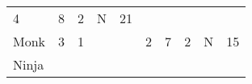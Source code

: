 \documentclass[12pt]{article}
\newcommand{\indexClass}[1]{\index{#1}}
\newcommand{\class}[1]{#1\indexClass{#1}}
\begin{document}
\begin{longtable}[]{@{}llllllllll@{}}
\begin{minipage}[t]{0.06\columnwidth}\raggedright\strut
4
\strut\end{minipage} &
\begin{minipage}[t]{0.06\columnwidth}\raggedright\strut
8
\strut\end{minipage} &
\begin{minipage}[t]{0.06\columnwidth}\raggedright\strut
2
\strut\end{minipage} &
\begin{minipage}[t]{0.07\columnwidth}\raggedright\strut
N
\strut\end{minipage} &
\begin{minipage}[t]{0.08\columnwidth}\raggedright\strut
21
\strut\end{minipage}\tabularnewline
\begin{minipage}[t]{0.13\columnwidth}\raggedright\strut
\class{Monk}
\strut\end{minipage} &
\begin{minipage}[t]{0.06\columnwidth}\raggedright\strut
3
\strut\end{minipage} &
\begin{minipage}[t]{0.06\columnwidth}\raggedright\strut
1
\strut\end{minipage} &
\begin{minipage}[t]{0.06\columnwidth}\raggedright\strut
\strut\end{minipage} &
\begin{minipage}[t]{0.06\columnwidth}\raggedright\strut
\strut\end{minipage} &
\begin{minipage}[t]{0.06\columnwidth}\raggedright\strut
2
\strut\end{minipage} &
\begin{minipage}[t]{0.06\columnwidth}\raggedright\strut
7
\strut\end{minipage} &
\begin{minipage}[t]{0.06\columnwidth}\raggedright\strut
2
\strut\end{minipage} &
\begin{minipage}[t]{0.07\columnwidth}\raggedright\strut
N
\strut\end{minipage} &
\begin{minipage}[t]{0.08\columnwidth}\raggedright\strut
15
\strut\end{minipage}\tabularnewline
\begin{minipage}[t]{0.13\columnwidth}\raggedright\strut
\class{Ninja}
\strut\end{minipage} &

\end{longtable}
\end{document}
